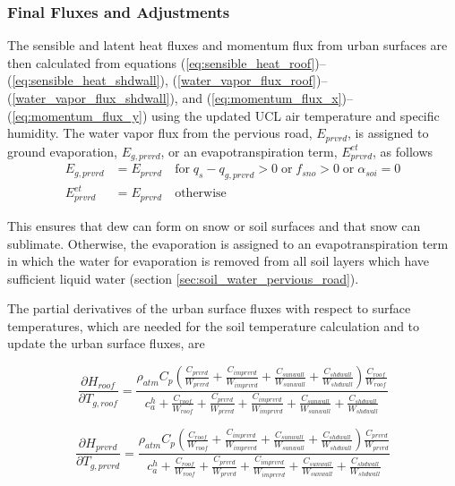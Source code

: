 \documentclass[12pt,authoryear]{elsarticle}
\numberwithin{equation}{section} %
\begin{document}
\subsubsection{Final Fluxes and Adjustments}
\label{sec:final_fluxes_adjustments}
The sensible and latent heat fluxes and momentum flux from urban surfaces are then calculated from equations (\ref{eq:sensible_heat_roof})--(\ref{eq:sensible_heat_shdwall}), (\ref{water_vapor_flux_roof})--(\ref{water_vapor_flux_shdwall}), and (\ref{eq:momentum_flux_x})--(\ref{eq:momentum_flux_y}) using the updated UCL air temperature and specific humidity. The water vapor flux from the pervious road, $E_{prvrd}$, is assigned to ground evaporation, $E_{g,prvrd}$, or an evapotranspiration term, $E_{prvrd}^{et}$, as follows
\begin{equation}
\begin{aligned}
E_{g,prvrd}&=E_{prvrd} \quad \textrm{for}\;q_{s}-q_{g,prvrd}>0\;\textrm{or}\;f_{sno}>0\;\textrm{or}\;\alpha_{soi}=0 \\
E_{prvrd}^{et}&=E_{prvrd} \quad \textrm{otherwise}
\end{aligned}
\end{equation}

This ensures that dew can form on snow or soil surfaces and that snow can sublimate. Otherwise, the evaporation is assigned to an evapotranspiration term in which the water for evaporation is removed from all soil layers which have sufficient liquid water (section \ref{sec:soil_water_pervious_road}).

The partial derivatives of the urban surface fluxes with respect to surface temperatures, which are needed for the soil temperature calculation and to update the urban surface fluxes, are

\begin{equation}
\label{eq:partial_derivatives_sensible_flux_temperature_roof}
\frac{\partial H_{roof}}{\partial T_{g,roof}} = \frac{\rho_{atm}C_{p}\left(\frac{C_{prvrd}}{W_{prvrd}}+\frac{C_{imprvrd}}{W_{imprvrd}}+\frac{C_{sunwall}}{W_{sunwall}}+\frac{C_{shdwall}}{W_{shdwall}}\right)\frac{C_{roof}}{W_{roof}}}{c_{a}^{h}+\frac{C_{roof}}{W_{roof}}+\frac{C_{prvrd}}{W_{prvrd}}+\frac{C_{imprvrd}}{W_{imprvrd}}+\frac{C_{sunwall}}{W_{sunwall}}+\frac{C_{shdwall}}{W_{shdwall}}}
\end{equation}

\begin{equation}
\label{eq:partial_derivatives_sensible_flux_temperature_prvrd}
\frac{\partial H_{prvrd}}{\partial T_{g,prvrd}} = \frac{\rho_{atm}C_{p}\left(\frac{C_{roof}}{W_{roof}}+\frac{C_{imprvrd}}{W_{imprvrd}}+\frac{C_{sunwall}}{W_{sunwall}}+\frac{C_{shdwall}}{W_{shdwall}}\right)\frac{C_{prvrd}}{W_{prvrd}}}{c_{a}^{h}+\frac{C_{roof}}{W_{roof}}+\frac{C_{prvrd}}{W_{prvrd}}+\frac{C_{imprvrd}}{W_{imprvrd}}+\frac{C_{sunwall}}{W_{sunwall}}+\frac{C_{shdwall}}{W_{shdwall}}}
\end{equation}
\end{document}
